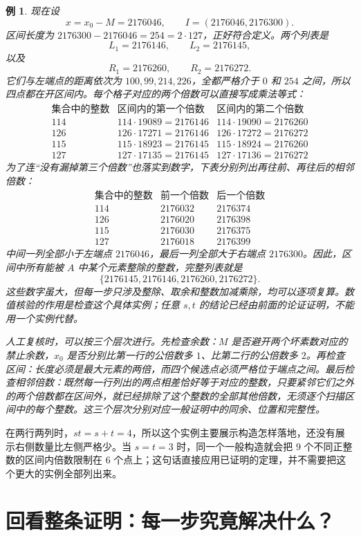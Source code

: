 \documentclass[UTF8,a4paper,oneside,openany,fontset=fandol,zihao=-4]{ctexbook}
\theoremstyle{guide}
\newtheorem{example}[theorem]{例}
\begin{document}
\begin{example}
现在设
\[
x=x_0-M=2176046,\qquad
I=(2176046,2176300).
\]
区间长度为 $2176300-2176046=254=2\cdot127$，正好符合定义。两个列表是
\[
L_1=2176146,\qquad L_2=2176145,
\]
以及
\[
R_1=2176260,\qquad R_2=2176272.
\]
它们与左端点的距离依次为 $100,99,214,226$，全都严格介于 $0$ 和 $254$ 之间，所以四点都在开区间内。每个格子对应的两个倍数可以直接写成乘法等式：
\[
\begin{array}{c|c|c}
\text{集合中的整数}&\text{区间内的第一个倍数}&\text{区间内的第二个倍数}\\\hline
114&114\cdot19089=2176146&114\cdot19090=2176260\\
126&126\cdot17271=2176146&126\cdot17272=2176272\\
115&115\cdot18923=2176145&115\cdot18924=2176260\\
127&127\cdot17135=2176145&127\cdot17136=2176272
\end{array}
\]
为了连“没有漏掉第三个倍数”也落实到数字，下表分别列出再往前、再往后的相邻倍数：
\[
\begin{array}{c|r|r}
\text{集合中的整数}&\text{前一个倍数}&\text{后一个倍数}\\\hline
114&2176032&2176374\\
126&2176020&2176398\\
115&2176030&2176375\\
127&2176018&2176399
\end{array}
\]
中间一列全部小于左端点 $2176046$，最后一列全部大于右端点 $2176300$。因此，区间中所有能被 $A$ 中某个元素整除的整数，完整列表就是
\[
\{2176145,2176146,2176260,2176272\}.
\]
这些数字虽大，但每一步只涉及整除、取余和整数加减乘除，均可以逐项复算。数值核验的作用是检查这个具体实例；任意 $s,t$ 的结论已经由前面的论证证明，不能用一个实例代替。

人工复核时，可以按三个层次进行。先检查余数：$M$ 是否避开两个坏素数对应的禁止余数，$x_0$ 是否分别比第一行的公倍数多 $1$、比第二行的公倍数多 $2$。再检查区间：长度必须是最大元素的两倍，而四个候选点必须严格位于端点之间。最后检查相邻倍数：既然每一行列出的两点相差恰好等于对应的整数，只要紧邻它们之外的两个倍数都在区间外，就已经排除了这个整数的全部其他倍数，无须逐个扫描区间中的每个整数。这三个层次分别对应一般证明中的同余、位置和完整性。
\end{example}

在两行两列时，$st=s+t=4$，所以这个实例主要展示构造怎样落地，还没有展示右侧数量比左侧严格少。当 $s=t=3$ 时，同一个一般构造就会把 $9$ 个不同正整数的区间内倍数限制在 $6$ 个点上；这句话直接应用已证明的定理，并不需要把这个更大的实例全部列出来。

\section{回看整条证明：每一步究竟解决什么？}\label{up:roadmap}
\end{document}
